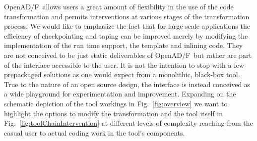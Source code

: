 \documentclass{book}
\newcommand{\OpenADF}{OpenAD/F}
\newcommand{\reffig}[1]{{Fig.~\ref{#1}}}
\begin{document}
\OpenADF\ allows users a great amount of flexibility in the use of the code transformation
and permits interventions at various stages of the transformation process.
We would like to emphasize the fact that for large scale applications 
the efficiency of checkpointing and taping can be improved merely by 
modifying the implementation of the run time support, the template and inlining 
code. 
They are not conceived  to be just static 
deliverables of \OpenADF\ but rather are part of the 
interface accessible to the user.
It is not the intention to stop with a few prepackaged solutions as one 
would expect from a 
monolithic, black-box tool.  
True to the nature of an open source design, the interface is instead conceived as a 
wide playground for 
experimentation and improvement. 
Expanding on the schematic depiction 
of the tool workings in \reffig{fig:overview} we want to highlight 
the options to modify the transformation and the tool itself in \reffig{fig:toolChainIntervention} 
at different levels of complexity reaching from the casual user to 
actual coding work in the tool's components.    
\end{document}
